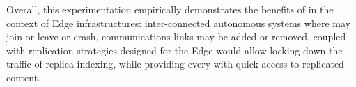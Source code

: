 \begin{asparadesc}
\noindent Overall, this experimentation empirically demonstrates the
benefits of \NAME in the context of Edge infrastructures:
inter-connected autonomous systems where \processes may join or leave
or crash, communications links may be added or removed. \NAME coupled
with replication strategies designed for the Edge would allow locking
down the traffic of replica indexing, while providing every \processes
with quick access to replicated content.

\end{asparadesc}



